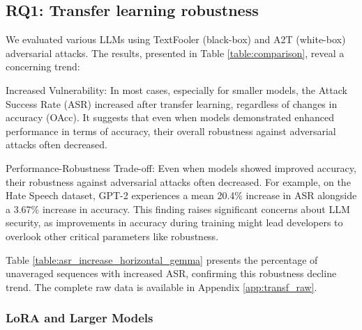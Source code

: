 \documentclass{article}
\begin{document}
\subsection{RQ1: Transfer learning robustness}
We evaluated various LLMs using TextFooler (black-box) and A2T (white-box) adversarial attacks. The results, presented in Table \ref{table:comparison}, reveal a concerning trend:

Increased Vulnerability: In most cases, especially for smaller models, the Attack Success Rate (ASR) increased after transfer learning, regardless of changes in accuracy (OAcc). It suggests that even when models demonstrated enhanced performance in terms of accuracy, their overall robustness against adversarial attacks often decreased. 

Performance-Robustness Trade-off: Even when models showed improved accuracy, their robustness against adversarial attacks often decreased.
For example, on the Hate Speech dataset, GPT-2 experiences a mean 20.4\% increase in ASR alongside a 3.67\% increase in accuracy. This finding raises significant concerns about LLM security, as improvements in accuracy during training might lead developers to overlook other critical parameters like robustness. 

Table \ref{table:asr_increase_horizontal_gemma} presents the percentage of unaveraged sequences with increased ASR, confirming this robustness decline trend. The complete raw data is available in Appendix \ref{app:transf_raw}.

\begin{table}[ht]
\centering
\scriptsize
\caption{Percentage of unaveraged individual training sequences where ASR increase is observed.}
\label{table:asr_increase_horizontal_gemma}
\end{table}

\subsubsection{LoRA and Larger Models}
\end{document}

